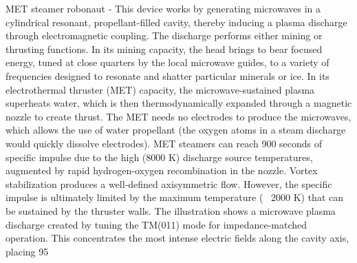 \documentclass[a4paper]{book}
\begin{document}

MET steamer robonaut - This device works by generating microwaves in a cylindrical resonant, propellant-filled cavity, thereby inducing a plasma discharge through electromagnetic coupling. The discharge performs either mining or thrusting functions. In its mining capacity, the head brings to bear focused energy, tuned at close quarters by the local microwave guides, to a variety of frequencies designed to resonate and shatter particular minerals or ice. In its electrothermal thruster (MET) capacity, the microwave-sustained plasma superheats water, which is then thermodynamically expanded through a magnetic nozzle to create thrust. The MET needs no electrodes to produce the microwaves, which allows the use of water propellant (the oxygen atoms in a steam discharge would quickly dissolve electrodes).  MET steamers can reach 900 seconds of specific impulse due to the high (8000 K) discharge source temperatures, augmented by rapid hydrogen-oxygen recombination in the nozzle. Vortex stabilization produces a well-defined axisymmetric flow. However, the specific impulse is ultimately limited by the maximum temperature (~ 2000 K) that can be sustained by the thruster walls.  The illustration shows a microwave plasma discharge created by tuning the TM(011) mode for impedance-matched operation.  This concentrates the most intense electric fields along the cavity axis, placing 95%
 
\end{document}
